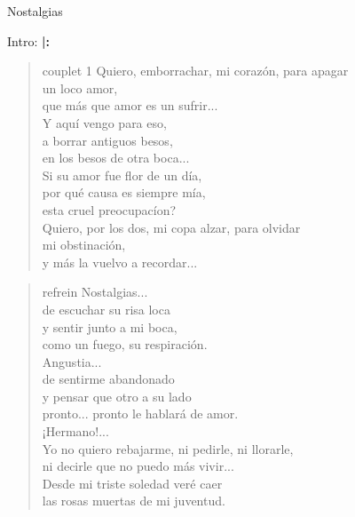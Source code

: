 \begin{song}{Nostalgias}
\begin{instrumental}{Intro:}
	\textbf{|:}
\end{instrumental}

\begin{verse}{couplet 1}
Quiero, emborrachar, mi corazón, para apagar\\
un loco amor,\\
que más que amor es un sufrir...\\
Y aquí vengo para eso,\\
a borrar antiguos besos,\\
en los besos de otra boca...\\ 
Si su amor fue flor de un día,\\
\textquestiondown por qué causa es siempre mía,\\
esta cruel preocupacíon? \hspace{2em} \\
Quiero, por los dos, mi copa alzar, para olvidar\\
mi obstinación,\\
y más la vuelvo a recordar...
\end{verse}

\begin{verse}{refrein}
Nostalgias...\\
de escuchar su risa loca\\
y sentir junto a mi boca,\\
como un fuego, su respiración.\\
Angustia...\\
\chord{---}de sentirme abandonado\\
y pensar que otro a su lado\\
pronto... pronto le hablará de amor.\\
¡Hermano!...   \chord{---}\\
Yo no quiero rebajarme, ni pedirle, ni llorarle,\\
ni decirle que no puedo más vivir...\\
Desde mi triste soledad veré caer\\
las rosas muertas de mi juventud.
\end{verse}


\end{song}

